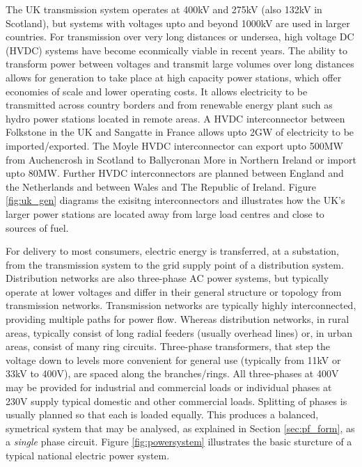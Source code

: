 The UK transmission system operates at 400kV and 275kV (also 132kV in
Scotland), but systems with voltages upto and beyond 1000kV are used in
larger countries.  For transmission over very long distances or
undersea, high voltage DC (HVDC) systems have become econmically viable in
recent years.  The ability to
transform power between voltages and transmit large volumes over long
distances allows for generation to take place at high capacity power stations,
which offer economies of scale and lower operating costs. It allows electricity to
be transmitted across country borders and from renewable energy plant such as
hydro power stations located in remote areas.  A HVDC interconnector between
Folkstone in the UK and Sangatte in France allows upto 2GW of
electricity to be imported/exported.  The Moyle HVDC interconnector can export
upto 500MW from Auchencrosh in Scotland to Ballycronan More in Northern
Ireland or import upto 80MW.  Further HVDC interconnectors are planned between
England and the Netherlands and between Wales and The Republic of Ireland.
Figure \ref{fig:uk_gen} diagrams the exisitng interconnectors and illustrates
how the UK's larger power stations are located away from large load centres and
close to sources of fuel.

%

For delivery to most consumers, electric energy is transferred, at a
substation, from the transmission system to the grid supply point of a distribution
system.  Distribution networks are also three-phase AC power systems, but
typically operate at lower voltages and differ in their general
structure or topology from transmission networks.  Transmission networks are
typically highly interconnected, providing multiple paths for power flow.
Whereas distribution networks, in rural areas, typically consist of long radial
feeders (usually overhead lines) or, in urban areas, consist of many ring
circuits.  Three-phase transformers, that step the voltage down to levels
more convenient for general use (typically from 11kV or 33kV to 400V), are spaced along the branches/rings. All three-phases at 400V may be provided for industrial and commercial loads
or individual phases at 230V supply typical domestic and other commercial
loads. Splitting of phases is usually planned so that each is loaded equally.
This produces a balanced, symetrical system that may be analysed, as explained
in Section \ref{sec:pf_form}, as a \textit{single} phase circuit.  Figure
\ref{fig:powersystem} illustrates the basic sturcture of a typical national
electric power system.


